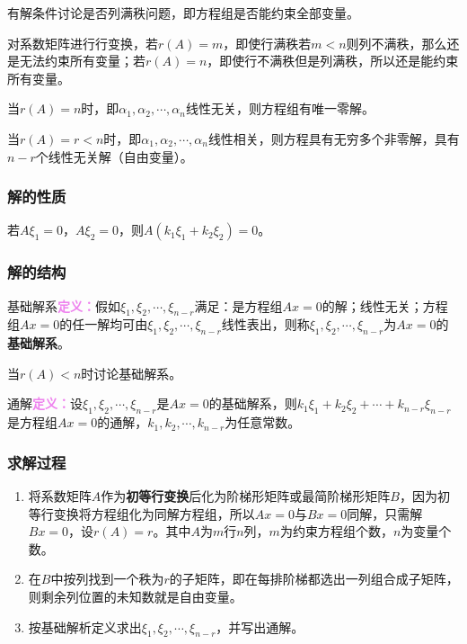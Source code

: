 \documentclass[UTF8, 12pt]{ctexart}
\begin{document}
有解条件讨论是否列满秩问题，即方程组是否能约束全部变量。

对系数矩阵进行行变换，若$r(A)=m$，即使行满秩若$m<n$则列不满秩，那么还是无法约束所有变量；若$r(A)=n$，即使行不满秩但是列满秩，所以还是能约束所有变量。

当$r(A)=n$时，即$\alpha_1,\alpha_2,\cdots,\alpha_n$线性无关，则方程组有唯一零解。

当$r(A)=r<n$时，即$\alpha_1,\alpha_2,\cdots,\alpha_n$线性相关，则方程具有无穷多个非零解，具有$n-r$个线性无关解（自由变量）。

\subsubsection{解的性质}

若$A\xi_1=0$，$A\xi_2=0$，则$A(k_1\xi_1+k_2\xi_2)=0$。

\subsubsection{解的结构}

基础解系\textcolor{violet}{\textbf{定义：}}假如$\xi_1,\xi_2,\cdots,\xi_{n-r}$满足：是方程组$Ax=0$的解；线性无关；方程组$Ax=0$的任一解均可由$\xi_1,\xi_2,\cdots,\xi_{n-r}$线性表出，则称$\xi_1,\xi_2,\cdots,\xi_{n-r}$为$Ax=0$的\textbf{基础解系}。

当$r(A)<n$时讨论基础解系。

通解\textcolor{violet}{\textbf{定义：}}设$\xi_1,\xi_2,\cdots,\xi_{n-r}$是$Ax=0$的基础解系，则$k_1\xi_1+k_2\xi_2+\cdots+k_{n-r}\xi_{n-r}$是方程组$Ax=0$的通解，$k_1,k_2,\cdots,k_{n-r}$为任意常数。

\subsubsection{求解过程}

\begin{enumerate}
    \item 将系数矩阵$A$作为\textbf{初等行变换}后化为阶梯形矩阵或最简阶梯形矩阵$B$，因为初等行变换将方程组化为同解方程组，所以$Ax=0$与$Bx=0$同解，只需解$Bx=0$，设$r(A)=r$。其中$A$为$m$行$n$列，$m$为约束方程组个数，$n$为变量个数。
    \item 在$B$中按列找到一个秩为$r$的子矩阵，即在每排阶梯都选出一列组合成子矩阵，则剩余列位置的未知数就是自由变量。
    \item 按基础解析定义求出$\xi_1,\xi_2,\cdots,\xi_{n-r}$，并写出通解。
\end{enumerate}
\end{document}
